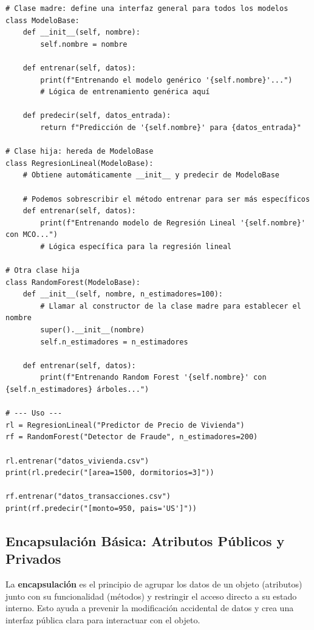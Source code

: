 \begin{example}
\text{ }\begin{verbatim}
# Clase madre: define una interfaz general para todos los modelos
class ModeloBase:
    def __init__(self, nombre):
        self.nombre = nombre

    def entrenar(self, datos):
        print(f"Entrenando el modelo genérico '{self.nombre}'...")
        # Lógica de entrenamiento genérica aquí
    
    def predecir(self, datos_entrada):
        return f"Predicción de '{self.nombre}' para {datos_entrada}"

# Clase hija: hereda de ModeloBase
class RegresionLineal(ModeloBase):
    # Obtiene automáticamente __init__ y predecir de ModeloBase
    
    # Podemos sobrescribir el método entrenar para ser más específicos
    def entrenar(self, datos):
        print(f"Entrenando modelo de Regresión Lineal '{self.nombre}' con MCO...")
        # Lógica específica para la regresión lineal

# Otra clase hija
class RandomForest(ModeloBase):
    def __init__(self, nombre, n_estimadores=100):
        # Llamar al constructor de la clase madre para establecer el nombre
        super().__init__(nombre)
        self.n_estimadores = n_estimadores
    
    def entrenar(self, datos):
        print(f"Entrenando Random Forest '{self.nombre}' con {self.n_estimadores} árboles...")

# --- Uso ---
rl = RegresionLineal("Predictor de Precio de Vivienda")
rf = RandomForest("Detector de Fraude", n_estimadores=200)

rl.entrenar("datos_vivienda.csv")
print(rl.predecir("[area=1500, dormitorios=3]"))

rf.entrenar("datos_transacciones.csv")
print(rf.predecir("[monto=950, pais='US']"))
\end{verbatim}
\end{example}

\subsection{Encapsulación Básica: Atributos Públicos y Privados}
\label{subsec:encapsulation}
La \textbf{encapsulación} es el principio de agrupar los datos de un objeto (atributos) junto con su funcionalidad (métodos) y restringir el acceso directo a su estado interno. Esto ayuda a prevenir la modificación accidental de datos y crea una interfaz pública clara para interactuar con el objeto.

